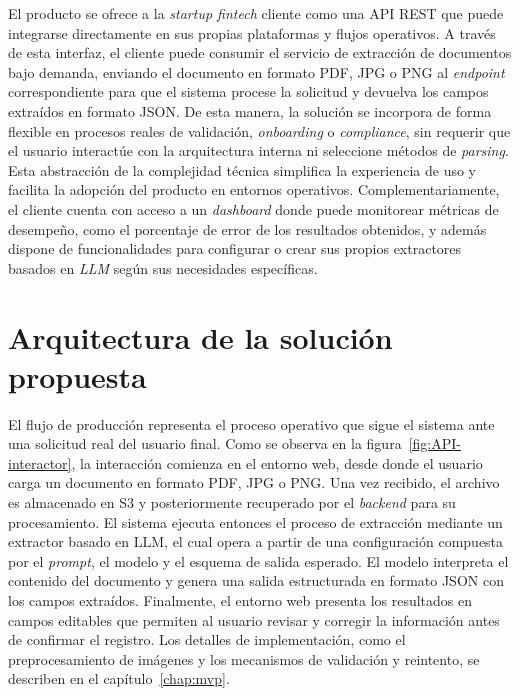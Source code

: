 El producto se ofrece a la \textit{startup fintech} cliente como una API REST que puede integrarse directamente en sus propias plataformas y flujos operativos. A través de esta interfaz, el cliente puede consumir el servicio de extracción de documentos bajo demanda, enviando el documento en formato PDF, JPG o PNG al \textit{endpoint} correspondiente para que el sistema procese la solicitud y devuelva los campos extraídos en formato JSON. De esta manera, la solución se incorpora de forma flexible en procesos reales de validación, \textit{onboarding} o \textit{compliance}, sin requerir que el usuario interactúe con la arquitectura interna ni seleccione métodos de \textit{parsing}. Esta abstracción de la complejidad técnica simplifica la experiencia de uso y facilita la adopción del producto en entornos operativos. Complementariamente, el cliente cuenta con acceso a un \textit{dashboard} donde puede monitorear métricas de desempeño, como el porcentaje de error de los resultados obtenidos, y además dispone de funcionalidades para configurar o crear sus propios extractores basados en \textit{LLM} según sus necesidades específicas.

\section{Arquitectura de la solución propuesta}

El flujo de producción representa el proceso operativo que sigue el sistema ante una solicitud real del usuario final. Como se observa en la figura~\ref{fig:API-interactor}, la interacción comienza en el entorno web, desde donde el usuario carga un documento en formato PDF, JPG o PNG. Una vez recibido, el archivo es almacenado en S3 y posteriormente recuperado por el \textit{backend} para su procesamiento. El sistema ejecuta entonces el proceso de extracción mediante un extractor basado en LLM, el cual opera a partir de una configuración compuesta por el \textit{prompt}, el modelo y el esquema de salida esperado. El modelo interpreta el contenido del documento y genera una salida estructurada en formato JSON con los campos extraídos. Finalmente, el entorno web presenta los resultados en campos editables que permiten al usuario revisar y corregir la información antes de confirmar el registro. Los detalles de implementación, como el preprocesamiento de imágenes y los mecanismos de validación y reintento, se describen en el capítulo~\ref{chap:mvp}.


